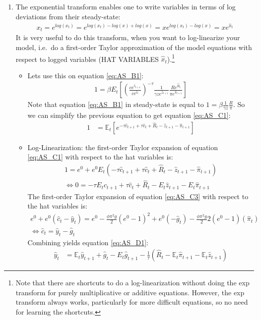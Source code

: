 \begin{enumerate}
\item The exponential transform enables one to write variables in terms of log deviations from their steady-state:
\begin{align*}
x_t = e^{log(x_t)} = e^{log(x_t) - log(x) + log(x)} = x e^{log(x_t)-log(x)} = x e^{\hat{x}_t}
\end{align*}
It is very useful to do this transform, when you want to log-linearize your model,
  i.e.\ do a first-order Taylor approximation of the model equations with respect to logged variables (HAT VARIABLES $\hat{x}_t$).\footnote{
Note that there are shortcuts to do a log-linearization without doing the exp transform for purely multiplicative or additive equations.
However, the exp transform always works, particularly for more difficult equations, so no need for learning the shortcuts.
}
\begin{itemize}    
    \item Lets use this on equation \eqref{eq:AS_B1}:
    \begin{align*}
    1 = \beta E_t \left[ \left(\frac{c e^{\hat{c}_{t+1}}}{c e^{\hat{c}_t}}\right)^{-\tau} \frac{1}{\gamma z e^{\hat{z}_{t+1}}} \frac{R e^{\hat{R}_t}}{\pi e^{\hat{\pi}_{t+1}}} \right]
    \end{align*}
    Note that equation \eqref{eq:AS_B1} in steady-state is equal to $1 = \beta \frac{1}{\gamma z}\frac{R}{\pi}$.
    So we can simplify the previous equation to get equation \eqref{eq:AS_C1}:
    \begin{align*}
    1 &= \mathbb{E}_t \left[e^{-\tau \hat{c}_{t+1} + \tau \hat{c}_{t} + \hat{R}_{t} - \hat{z}_{t+1} - \hat{\pi}_{t+1} }\right]
    \end{align*}    
    \item Log-Linearization: the first-order Taylor expansion of equation \eqref{eq:AS_C1} with respect to the hat variables is:
    \begin{align*}
    1 = e^0 + e^0 E_t \left(-\tau \hat{c}_{t+1} + \tau \hat{c}_{t} + \hat{R}_{t} - \hat{z}_{t+1} - \hat{\pi}_{t+1}  \right)\\
    \Leftrightarrow
    0 = -\tau E_t \hat{c}_{t+1} + \tau \hat{c}_{t} + \hat{R}_{t} - E_t\hat{z}_{t+1} - E_t \hat{\pi}_{t+1}
    \end{align*}
    The first-order Taylor expansion of equation \eqref{eq:AS_C3} with respect to the hat variables is:
    \begin{align*}
    e^0 + e^0\left(\hat{c}_t - \hat{y}_t\right) = e^0 - \frac{\phi \pi^2 g}{2} (e^0-1)^2 + e^0(-\hat{g}_t) - \frac{\phi \pi^2 g}{2} 2 \left(e^0-1\right)(\hat{\pi}_t)\\
    \Leftrightarrow \hat{c}_t = \hat{y}_t -\hat{g}_t
    \end{align*}
    Combining yields equation \eqref{eq:AS_D1}:
    \begin{align*}
    \hat{y}_{t} &= \mathbb{E}_t \hat{y}_{t+1} + \hat{g}_{t} - E_t\hat{g}_{t+1} - \frac{1}{\tau} \left(\hat{R}_{t}- \mathbb{E}_t \hat{\pi}_{t+1} - \mathbb{E}_t \hat{z}_{t+1}\right)
    \end{align*}
\end{itemize}


\end{enumerate}
